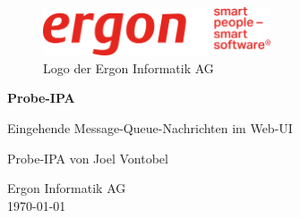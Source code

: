 \begin{titlepage}

    \begin{figure}
        \begin{center}
            \includegraphics[width=0.6\textwidth]{ressourcen/ergon_logo_gross}
            \captionsetup{textformat=empty, labelformat=empty}
            \caption[Logo der Ergon Informatik AG~\parencite{ergonlogo}]{Logo der Ergon Informatik AG}\label{fig:ergon-logo-gross}
        \end{center}
    \end{figure}
    \begin{center}
        \vspace*{2cm}
        \Huge
        \textbf{Probe-IPA}

        \vspace{0.5cm}
        \Large
        Eingehende Message-Queue-Nachrichten im Web-UI

        \vfill

        \Large
        Probe-IPA von Joel Vontobel

        \vspace*{3cm}

        \large
        Ergon Informatik AG\\
        \today\\

    \end{center}
\end{titlepage}

